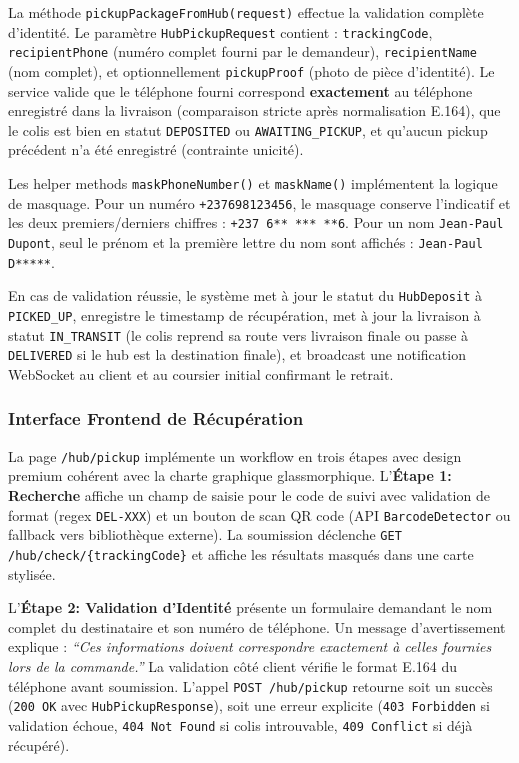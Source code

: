 La méthode \texttt{pickupPackageFromHub(request)} effectue la validation complète d'identité. Le paramètre \texttt{HubPickupRequest} contient : \texttt{trackingCode}, \texttt{recipientPhone} (numéro complet fourni par le demandeur), \texttt{recipientName} (nom complet), et optionnellement \texttt{pickupProof} (photo de pièce d'identité). Le service valide que le téléphone fourni correspond \textbf{exactement} au téléphone enregistré dans la livraison (comparaison stricte après normalisation E.164), que le colis est bien en statut \texttt{DEPOSITED} ou \texttt{AWAITING\_PICKUP}, et qu'aucun pickup précédent n'a été enregistré (contrainte unicité).

Les helper methods \texttt{maskPhoneNumber()} et \texttt{maskName()} implémentent la logique de masquage. Pour un numéro \texttt{+237698123456}, le masquage conserve l'indicatif et les deux premiers/derniers chiffres : \texttt{+237 6** *** **6}. Pour un nom \texttt{Jean-Paul Dupont}, seul le prénom et la première lettre du nom sont affichés : \texttt{Jean-Paul D*****}.

En cas de validation réussie, le système met à jour le statut du \texttt{HubDeposit} à \texttt{PICKED\_UP}, enregistre le timestamp de récupération, met à jour la livraison à statut \texttt{IN\_TRANSIT} (le colis reprend sa route vers livraison finale ou passe à \texttt{DELIVERED} si le hub est la destination finale), et broadcast une notification WebSocket au client et au coursier initial confirmant le retrait.

\subsubsection{Interface Frontend de Récupération}

La page \texttt{/hub/pickup} implémente un workflow en trois étapes avec design premium cohérent avec la charte graphique glassmorphique. L'\textbf{Étape 1: Recherche} affiche un champ de saisie pour le code de suivi avec validation de format (regex \texttt{DEL-XXX}) et un bouton de scan QR code (API \texttt{BarcodeDetector} ou fallback vers bibliothèque externe). La soumission déclenche \texttt{GET /hub/check/\{trackingCode\}} et affiche les résultats masqués dans une carte stylisée.

L'\textbf{Étape 2: Validation d'Identité} présente un formulaire demandant le nom complet du destinataire et son numéro de téléphone. Un message d'avertissement explique : \textit{``Ces informations doivent correspondre exactement à celles fournies lors de la commande.''} La validation côté client vérifie le format E.164 du téléphone avant soumission. L'appel \texttt{POST /hub/pickup} retourne soit un succès (\texttt{200 OK} avec \texttt{HubPickupResponse}), soit une erreur explicite (\texttt{403 Forbidden} si validation échoue, \texttt{404 Not Found} si colis introuvable, \texttt{409 Conflict} si déjà récupéré).

